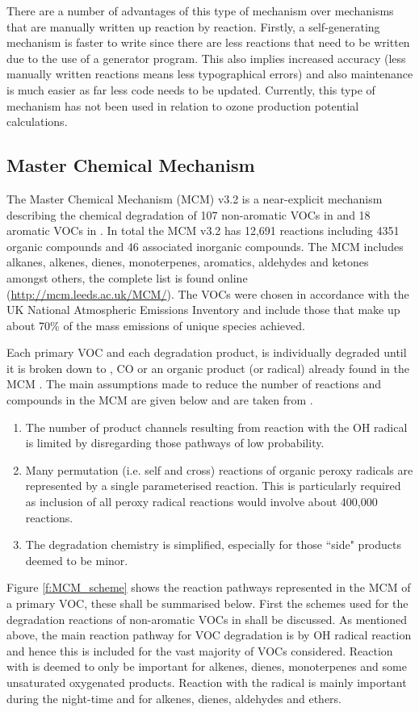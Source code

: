 There are a number of advantages of this type of mechanism over mechanisms that are manually written up reaction by reaction. 
Firstly, a self-generating mechanism is faster to write since there are less reactions that need to be written due to the use 
of a generator program. This also implies increased accuracy (less manually written reactions means less typographical errors) 
and also maintenance is much easier as far less code needs to be updated. Currently, this type of mechanism has not been used 
in relation to ozone production potential calculations. 

\subsection{Master Chemical Mechanism}
The Master Chemical Mechanism (MCM) v3.2 is a near-explicit mechanism describing the chemical degradation of 107 non-aromatic 
VOCs in \citep{Saunders:2003} and 18 aromatic VOCs in \citep{Jenkin:2003}. In total the MCM v3.2 has 12,691 reactions including 
4351 organic compounds and 46 associated inorganic compounds. The MCM includes alkanes, alkenes, dienes, monoterpenes, 
aromatics, aldehydes and ketones amongst others, the complete list is found online (\url{http://mcm.leeds.ac.uk/MCM/}). The VOCs
were chosen in accordance with the UK National Atmospheric Emissions Inventory and include those that make up about 70\% of the 
mass emissions of unique species achieved.

Each primary VOC and each degradation product, is individually degraded until it is broken down to , CO or an organic 
product (or radical) already found in the MCM \citep{Jenkin:1997}. The main assumptions made to reduce the number of reactions 
and compounds in the MCM are given below and are taken from \citep{Jenkin:1997}.
\begin{enumerate}
    \item The number of product channels resulting from reaction with the OH radical is limited by disregarding those pathways 
        of low probability.
    \item Many permutation (i.e. self and cross) reactions of organic peroxy radicals are represented by a single parameterised
        reaction. This is particularly required as inclusion of all peroxy radical reactions would involve about 400,000 
        reactions.
    \item The degradation chemistry is simplified, especially for those ``side" products deemed to be minor.
\end{enumerate}
Figure \ref{f:MCM_scheme} shows the reaction pathways represented in the MCM of a primary VOC, these shall be summarised below.
First the schemes used for the degradation reactions of non-aromatic VOCs in \citep{Saunders:2003} shall be discussed. As 
mentioned above, the main reaction pathway for VOC degradation is by OH radical reaction and hence this is included for the 
vast majority of VOCs considered. Reaction with  is deemed to only be important for alkenes, dienes, monoterpenes and 
some unsaturated oxygenated products. Reaction with the  radical is mainly important during the night-time and for 
alkenes, dienes, aldehydes and ethers.  

